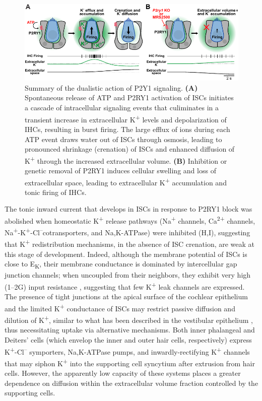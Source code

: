 \documentclass[9pt,lineno]{elife}
\begin{document}
\begin{figure}
\includegraphics[width=\linewidth]{figures/Fig9.pdf}
\caption{Summary of the dualistic action of P2Y1 signaling.
\textbf{(A)} Spontaneous release of ATP and P2RY1 activation of ISCs initiates a cascade of intracellular signaling events that culiminates in a transient increase in extracellular K\textsuperscript{+} levels and depolarization of IHCs, resulting in burst firing. The large efflux of ions during each ATP event draws water out of ISCs through osmosis, leading to pronounced shrinkage (crenation) of ISCs and enhanced diffusion of K\textsuperscript{+} through the increased extracellular volume.
\textbf{(B)} Inhibition or genetic removal of P2RY1 induces cellular swelling and loss of extracellular space, leading to extracellular K\textsuperscript{+} accumulation and tonic firing of IHCs.
}
\label{fig:f9}
\end{figure}

The tonic inward current that develops in ISCs in response to P2RY1 block was abolished when homeostatic K\textsuperscript{+} release pathways (Na\textsuperscript{+} channels, Ca\textsuperscript{2+} channels, Na\textsuperscript{+}-K\textsuperscript{+}-Cl\textsuperscript{--}cotransporters, and Na,K-ATPase) were inhibited (H,I), suggesting that K\textsuperscript{+} redistribution mechanisms, in the absence of ISC crenation, are weak at this stage of development. Indeed, although the membrane potential of ISCs is close to E\textsubscript{K}, their membrane conductance is dominated by intercellular gap junction channels; when uncoupled from their neighbors, they exhibit very high (1--2G\textohm) input resistance \citep{Jagger2014,Wang2015}, suggesting that few K\textsuperscript{+} leak channels are expressed. The presence of tight junctions at the apical surface of the cochlear epithelium and the limited K\textsuperscript{+} conductance of ISCs may restrict passive diffusion and dilution of K\textsuperscript{+}, similar to what has been described in the vestibular epithelium \citep{Contini2017}, thus necessitating uptake via alternative mechanisms. Both inner phalangeal and Deiters' cells (which envelop the inner and outer hair cells, respectively) express K\textsuperscript{+}-Cl\textsuperscript{--} symporters, Na,K-ATPase pumps, and inwardly-rectifying K\textsuperscript{+} channels that may siphon K\textsuperscript{+} into the supporting cell syncytium after extrusion from hair cells. However, the apparently low capacity of these systems places a greater dependence on diffusion within the extracellular volume fraction controlled by the supporting cells. 
\end{document}
